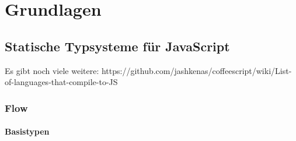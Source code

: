 \chapter{Grundlagen}
\label{chap:basics}

\section{Statische Typsysteme für JavaScript}

Es gibt noch viele weitere: https://github.com/jashkenas/coffeescript/wiki/List-of-languages-that-compile-to-JS

\subsection{Flow}
\label{subsection:flow}

\subsubsection{Basistypen}

